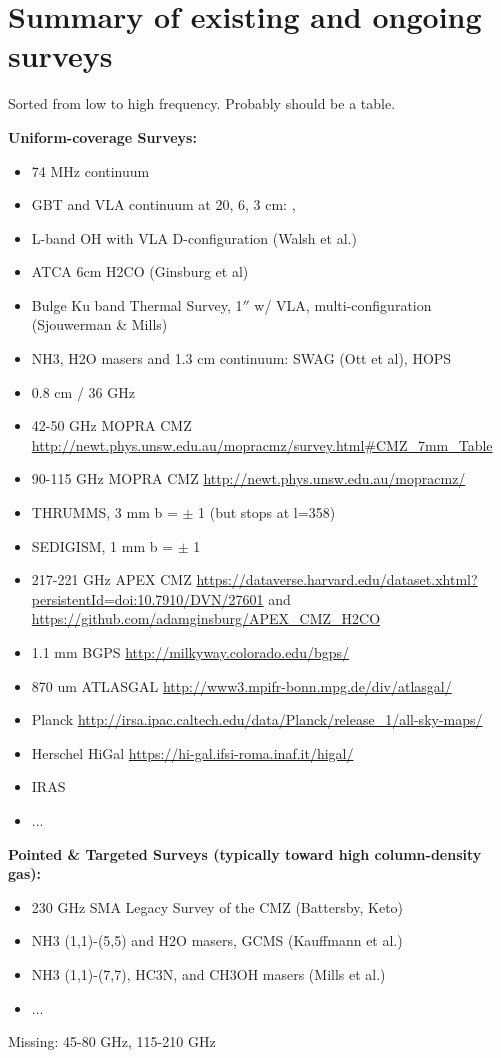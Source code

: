 \section{Summary of existing and ongoing surveys}
Sorted from low to high frequency.  Probably should be a table.

{\bf Uniform-coverage Surveys:}
\begin{itemize}
    \item 74 MHz continuum \citep{Yusef-Zadeh2013c}
    \item GBT and VLA continuum at 20, 6, 3 cm: \citet{Law2008a}, \citet{Law2008b}
    \item L-band OH with VLA D-configuration (Walsh et al.)
    \item ATCA 6cm H2CO (Ginsburg et al)
    \item Bulge Ku band Thermal Survey, 1$''$ w/ VLA, multi-configuration (Sjouwerman \& Mills)
    \item NH3, H2O masers and 1.3 cm continuum: SWAG (Ott et al), HOPS \citep{Walsh2011a}
    \item 0.8 cm / 36 GHz \citep{Yusef-Zadeh2013a}
    \item 42-50 GHz MOPRA CMZ \url{http://newt.phys.unsw.edu.au/mopracmz/survey.html#CMZ_7mm_Table}
    \item 90-115 GHz MOPRA CMZ \url{http://newt.phys.unsw.edu.au/mopracmz/} \citep{Jones2012a}
    \item THRUMMS, 3 mm b = $\pm$ 1 (but stops at l=358)
    \item SEDIGISM, 1 mm b = $\pm$ 1 
    \item 217-221 GHz APEX CMZ \url{https://dataverse.harvard.edu/dataset.xhtml?persistentId=doi:10.7910/DVN/27601} and \url{https://github.com/adamginsburg/APEX_CMZ_H2CO}
    \item 1.1 mm BGPS \url{http://milkyway.colorado.edu/bgps/}
    \item 870 um ATLASGAL \url{http://www3.mpifr-bonn.mpg.de/div/atlasgal/}
    \item Planck \url{http://irsa.ipac.caltech.edu/data/Planck/release_1/all-sky-maps/}
    \item Herschel HiGal \url{https://hi-gal.ifsi-roma.inaf.it/higal/}
    \item IRAS
    \item ...
\end{itemize}

{\bf Pointed & Targeted Surveys (typically toward high column-density gas):}
\begin{itemize}
    \item 230 GHz SMA Legacy Survey of the CMZ (Battersby, Keto)
    \item NH3 (1,1)-(5,5) and H2O masers, GCMS (Kauffmann et al.)
    \item NH3 (1,1)-(7,7), HC3N, and CH3OH masers (Mills et al.)
    \item ...
\end{itemize}

Missing: 45-80 GHz, 115-210 GHz